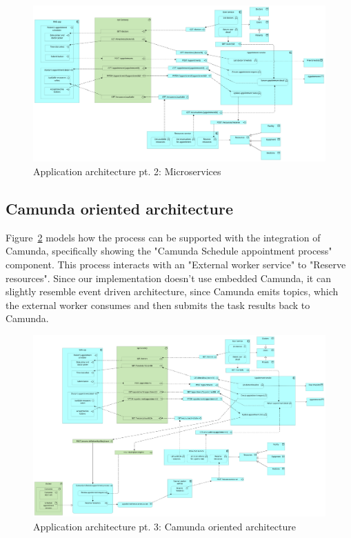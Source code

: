 \documentclass[11pt,english,a4paper,twoside]{article}
\begin{document}
\begin{figure}[H]
    \centering
    \includegraphics[width=\textwidth]{./fig/6. Application Microservices.png}
    \caption{Application architecture pt. 2: Microservices}
    \label{fig:microservices}
\end{figure}

\subsection{Camunda oriented architecture}

Figure~\ref{fig:camunda} models how the process can be supported with
the integration of Camunda, specifically showing the "Camunda Schedule
appointment process" component. This process interacts with an "External
worker service" to "Reserve resources". Since our implementation doesn't
use embedded Camunda, it can slightly resemble event driven architecture,
since Camunda emits topics, which the external worker consumes and then
submits the task results back to Camunda.

\begin{figure}[H]
    \centering
    \includegraphics[width=\textwidth]{./fig/7. Application Camunda.png}
    \caption{Application architecture pt. 3: Camunda oriented architecture}
    \label{fig:camunda}
\end{figure}
\end{document}
